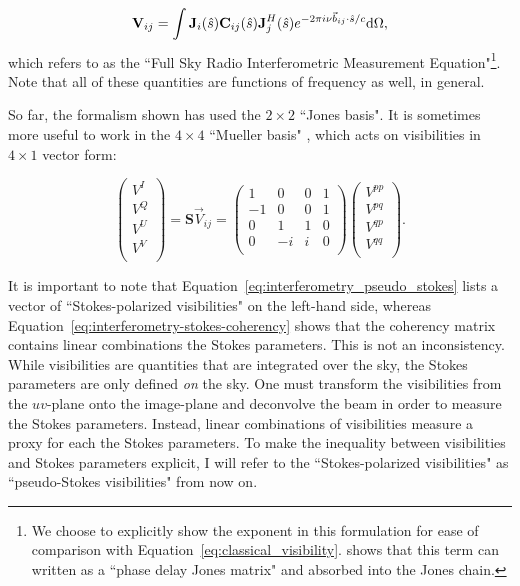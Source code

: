 \begin{equation}
\textbf{V}_{ij} = \int \textbf{J}_i(\hat{s}) \textbf{C}_{ij}(\hat{s}) \textbf{J}_j^H(\hat{s}) e^{-2\pi i \nu \vec{b}_{ij}\cdot\hat{s}/c} {\rm d}\Omega,
\label{eq:RIME}
\end{equation}
which \cite{Smirnov.11} refers to as the ``Full Sky Radio Interferometric Measurement Equation"\footnote{We choose to explicitly show the exponent in this formulation for ease of comparison with Equation~\ref{eq:classical_visibility}. \cite{Smirnov.11} shows that this term can written as a ``phase delay Jones matrix" and absorbed into the Jones chain.}. Note that all of these quantities are functions of frequency as well, in general.

So far, the formalism shown has used the $2\times 2$ ``Jones basis". It is sometimes more useful to work in the $4\times 4$ ``Mueller basis" \citep{Mueller.48}, which acts on visibilities in $4\times 1$ vector form:

\begin{equation}
\begin{pmatrix}
V^I \\
V^Q \\
V^U \\
V^V \\
\end{pmatrix}
=
\textbf{S}\vec{V}_{ij}
= 
\begin{pmatrix}
1 & 0 & 0 & 1 \\
-1 & 0 & 0 & 1\\
0 & 1 & 1 & 0 \\
0 & -i & i & 0 \\
\end{pmatrix}
\begin{pmatrix}
V^{pp} \\
V^{pq} \\
V^{qp} \\
V^{qq} \\
\end{pmatrix}.
\label{eq:interferometry_pseudo_stokes}
\end{equation} 

It is important to note that Equation~\ref{eq:interferometry_pseudo_stokes} lists a vector of ``Stokes-polarized visibilities" on the left-hand side, whereas  Equation~\ref{eq:interferometry-stokes-coherency} shows that the coherency matrix contains linear combinations the Stokes parameters. This is not an inconsistency. While visibilities are quantities that are integrated over the sky, the Stokes parameters are only defined \textit{on} the sky. One must transform the visibilities from the $uv$-plane onto the image-plane and deconvolve the beam in order to measure the Stokes parameters. Instead, linear combinations of visibilities measure a proxy for each the Stokes parameters. To make the inequality between visibilities and Stokes parameters explicit, I will refer to the ``Stokes-polarized visibilities" as ``pseudo-Stokes visibilities" from now on.

